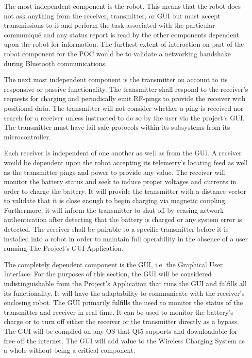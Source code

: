 \documentclass[12pt]{article}
\begin{document}
The most independent component is the robot.  This means that the robot does not ask anything from the receiver, transmitter, or GUI but must accept transmissions to it and perform the task associated with the particular communiqué and any status report is read by the other components dependent upon the robot for information.  The furthest extent of interaction on part of the robot component for the POC would be to validate a networking handshake during Bluetooth communications.\\ \indent

The next most independent component is the transmitter on account to its responsive or passive functionality.  The transmitter shall respond to the receiver's requests for charging and periodically emit RF-pings to provide the receiver with positional data.  The transmitter will not consider whether a ping is received nor search for a receiver unless instructed to do so by the user via the project's GUI.  The transmitter must have fail-safe protocols within its subsystems from its microcontroller.\\ \indent

Each receiver is independent of one another as well as from the GUI.  A receiver would be dependent upon the robot accepting its telemetry's locating feed as well as the transmitter pings and power to provide any value.  The receiver will monitor the battery status and seek to induce proper voltages and currents in order to charge the battery.  It will provide the transmitter with a distance vector to validate that it is close enough to begin charging via magnetic coupling.  Furthermore, it will inform the transmitter to shut off by ceasing network authentication after detecting that the battery is charged or any system error is detected. The receiver shall be pairable to a specific transmitter before it is installed into a robot in order to maintain full operability in the absence of a user running The Project's GUI Application.\\  \indent

The completely dependent component is the GUI, i.e. the Graphical User Interface.  For the purposes of this section, the GUI will be considered indistinguishable from the Project's Application that runs the GUI and fulfills all its functionality.  It will have the adaptability to communicate with the receiver's enclosing robot.  The GUI primarily fulfills the need to monitor the status of the transmitter and receiver in real time.  It can be used to monitor the battery's charge or to turn off either the receiver or the transmitter directly as a bypass.  The GUI will be compiled on any OS that Qt5 supports and downloadable for free off the internet.  The GUI will add value to the Wireless Charging System as a whole without being a critical component.
\end{document}
